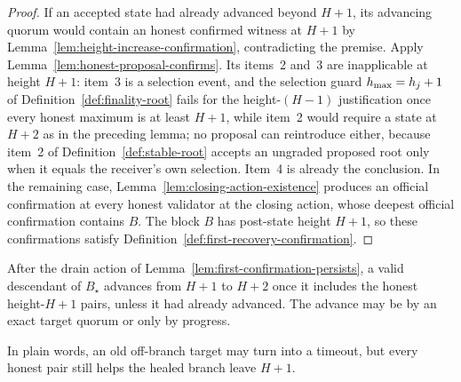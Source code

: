 \begin{proof}
If an accepted state had already advanced beyond \(H+1\), its advancing
quorum would contain an honest confirmed witness at \(H+1\) by
Lemma~\ref{lem:height-increase-confirmation}, contradicting the premise.
Apply Lemma~\ref{lem:honest-proposal-confirms}.  Its items~2 and~3 are
inapplicable at height \(H+1\): item~3 is a selection event, and the
selection guard \(h_{\max}=h_j+1\) of Definition~\ref{def:finality-root}
fails for the height-\((H{-}1)\) justification once every honest maximum
is at least \(H+1\), while item~2 would require a state at \(H+2\) as in
the preceding lemma; no proposal can reintroduce either, because item~2
of Definition~\ref{def:stable-root} accepts an ungraded proposed root
only when it equals the receiver's own selection.  Item~4 is already the
conclusion.
In the remaining case, Lemma~\ref{lem:closing-action-existence} produces
an official confirmation at every honest validator at the closing action,
whose deepest official confirmation contains \(B\).
The block \(B\) has post-state height \(H+1\), so these confirmations
satisfy Definition~\ref{def:first-recovery-confirmation}.
\end{proof}

\begin{lemma}
\label{lem:recovery-height-justifies}
After the drain action of
Lemma~\ref{lem:first-confirmation-persists}, a valid descendant of
\(B_\star\) advances from \(H+1\) to \(H+2\) once it includes the honest
height-\(H+1\) pairs, unless it had already advanced.  The advance may be by
an exact target quorum or only by progress.

In plain words, an old off-branch target may turn into a timeout, but every
honest pair still helps the healed branch leave \(H+1\).
\end{lemma}

